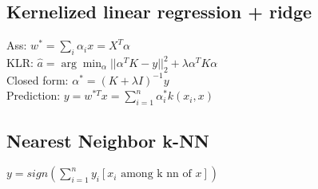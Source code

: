 \subsection*{Kernelized linear regression + ridge}
Ass: $w^*=\sum_i \alpha_i x=X^T \alpha$\\
KLR: $\hat{a}= \arg \min_\alpha ||\alpha^T K -y||_2^2 + \lambda \alpha^T K \alpha$\\
Closed form: $\alpha^* = (K+\lambda I)^{-1} y$\\
Prediction: $y = w^{*T} x = \sum_{i=1}^n \alpha_i^* k(x_i,x)$

\subsection*{Nearest Neighbor k-NN}
$y=sign(\sum_{i=1}^n y_i [x_i \text{ among k nn of } x])$